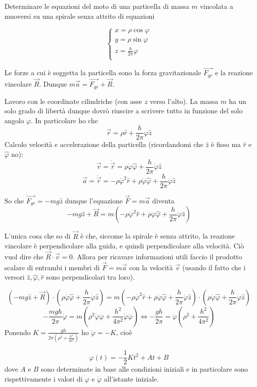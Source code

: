 \documentclass[../main.tex]{subfiles}
\begin{document}

\textex

Determinare le equazioni del moto di una particella di massa $m$ vincolata a muoversi su una spirale senza attrito di equazioni 

$$\begin{cases}
x=\rho\cos\varphi \\
y=\rho\sin\varphi \\
z=\frac{h}{2\pi}\varphi \\
\end{cases}$$


\solution

Le forze a cui è soggetta la particella sono la forza gravitazionale $\overrightarrow{F_{gr}}$ e la reazione vincolare $\overrightarrow{R}$. Dunque $m\overrightarrow{a} = \overrightarrow{F_{gr}} + \overrightarrow{R}$.

Lavoro con le coordinate cilindriche (con asse $z$ verso l'alto). La massa $m$ ha un solo grado di libertà dunque dovrò riuscire a scrivere tutto in funzione del solo angolo $\varphi$. In particolare ho che $$ \overrightarrow{r} = \rho\hat r + \frac{h}{2\pi}\varphi\hat z$$
Calcolo velocità e accelerazione della particella (ricordandomi che $\hat z$ è fisso ma $\hat r$ e $\hat \varphi$ no): $$ \overrightarrow{v} = \dot {\overrightarrow{r}} = \rho\dot\varphi\hat\varphi + \frac{h}{2\pi}\dot\varphi\hat z$$
$$\overrightarrow{a} = \ddot{\overrightarrow{r}} = -\rho{\dot\varphi}^2\hat r +  \rho \ddot\varphi\hat\varphi + \frac{h}{2\pi}\ddot\varphi\hat z$$

So che $\overrightarrow{F_{gr}} = -mg\hat z$ dunque l'equazione $\overrightarrow{F} = m\overrightarrow{a}$ diventa $$-mg\hat z + \overrightarrow{R} = m\left ( -\rho{\dot\varphi}^2\hat r +  \rho \ddot\varphi\hat\varphi + \frac{h}{2\pi}\ddot\varphi\hat z\right )$$

L'unica cosa che so di $\overrightarrow R$ è che, siccome la spirale è senza attrito, la reazione vincolare è perpendicolare alla guida, e quindi perpendicolare alla velocità. Ciò vuol dire che $\overrightarrow R \cdot \overrightarrow v = 0$. Allora per ricavare informazioni utili faccio il prodotto scalare di entrambi i membri di $\overrightarrow{F} = m\overrightarrow{a}$ con la velocità $\overrightarrow v$ (usando il fatto che i versori $\hat z, \hat\varphi, \hat r$ sono perpendicolari tra loro).

$$\left (-mg\hat z + \overrightarrow R\right )\cdot \left ( \rho\dot\varphi\hat\varphi + \frac{h}{2\pi}\dot\varphi\hat z\right ) = m\left (  -\rho{\dot\varphi}^2\hat r +  \rho \ddot\varphi\hat\varphi + \frac{h}{2\pi}\ddot\varphi\hat z\right )\cdot   \left ( \rho\dot\varphi\hat\varphi + \frac{h}{2\pi}\dot\varphi\hat z\right )   $$
$$-\frac{mgh}{2\pi}\dot\varphi = m\left ( \rho^2\dot\varphi\ddot\varphi + \frac{h^2}{4\pi^2}\dot\varphi\ddot\varphi\right ) \Leftrightarrow -\frac{gh}{2\pi} = \ddot\varphi\left ( \rho^2+\frac{h^2}{4\pi^2}\right ) $$
Ponendo $K = \frac{gh}{2\pi\left ( \rho^2 + \frac{h^2}{4\pi^2}\right ) }$ ho $\ddot\varphi =- K$, cioè

$$\varphi\left ( t \right ) =- \frac{1}{2}Kt^2 + At + B$$
dove $A$ e $B$ sono determinate in base alle condizioni iniziali e in particolare sono rispettivamente i valori di $\varphi$ e $\dot\varphi$ all'istante iniziale.
\end{document}
